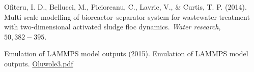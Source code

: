 \documentclass[12pt,titlepage]{report}
\theoremstyle{definition}
\theoremstyle{remark}
\begin{document}
\begin{thebibliography}{94}

 Ofiteru, I. D., Bellucci, M., Picioreanu, C., Lavric, V., \& Curtis, T. P. (2014). Multi-scale modelling of bioreactor–separator system for wastewater treatment with two-dimensional activated sludge floc dynamics. {\it Water research}, $50, 382-395$.

 Emulation of LAMMPS model outputs (2015). Emulation of LAMMPS model outputs. \href{https://github.com/darrenjw/nufeb/blob/master/LargeScaleModelling/Oluwole/code2/Oluwole3_doc.pdf)}{Oluwole3.pdf}

\end{thebibliography}{}
\end{document}
